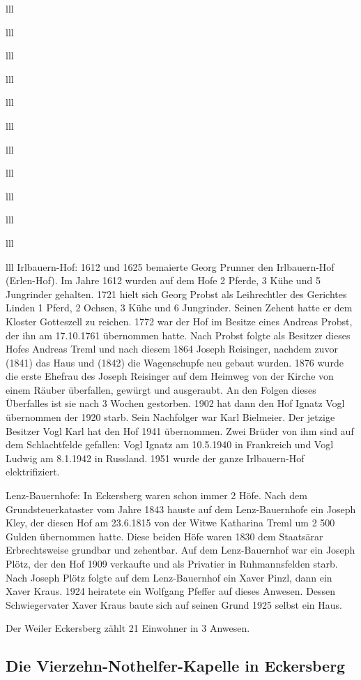 \documentclass[12pt,a4pager]{book}
\begin{document}
\begin{tabuluar}{lll}
\begin{tabuluar}{lll}
\begin{tabuluar}{lll}
\begin{tabuluar}{lll}
\begin{tabuluar}{lll}
\begin{tabuluar}{lll}
\begin{tabuluar}{lll}
\begin{tabuluar}{lll}
\begin{tabuluar}{lll}
\begin{tabuluar}{lll}
\begin{tabuluar}{lll}
\begin{tabuluar}{lll}
Irlbauern-Hof: 1612 und 1625 bemaierte Georg Prunner den Irlbauern-Hof
(Erlen-Hof). Im Jahre 1612 wurden auf dem Hofe 2 Pferde, 3 Kühe und 5 Jungrinder
gehalten. 1721 hielt sich Georg Probst als Leihrechtler des Gerichtes Linden 1
Pferd, 2 Ochsen, 3 Kühe und 6 Jungrinder. Seinen Zehent hatte er dem Kloster
Gotteszell zu reichen. 1772 war der Hof im Besitze eines Andreas Probst, der ihn
am 17.10.1761 übernommen hatte. Nach Probst folgte als Besitzer dieses Hofes
Andreas Treml und nach diesem 1864 Joseph Reisinger, nachdem zuvor (1841) das
Haus und (1842) die Wagenschupfe neu gebaut wurden. 1876 wurde die erste Ehefrau
des Joseph Reisinger auf dem Heimweg von der Kirche von einem Räuber überfallen,
gewürgt und ausgeraubt. An den Folgen dieses Überfalles ist sie nach 3 Wochen
gestorben. 1902 hat dann den Hof Ignatz Vogl übernommen der 1920 starb. Sein
Nachfolger war Karl Bielmeier. Der jetzige Besitzer Vogl Karl hat den Hof 1941
übernommen. Zwei Brüder von ihm sind auf dem Schlachtfelde gefallen: Vogl Ignatz
am 10.5.1940 in Frankreich und Vogl Ludwig am 8.1.1942 in Russland. 1951 wurde
der ganze Irlbauern-Hof elektrifiziert.

Lenz-Bauernhofe: In Eckersberg waren schon immer 2 Höfe. Nach dem
Grundsteuerkataster vom Jahre 1843 hauste auf dem Lenz-Bauernhofe ein Joseph
Kley, der diesen Hof am 23.6.1815 von der Witwe Katharina Treml um 2 500 Gulden
übernommen hatte. Diese beiden Höfe waren 1830 dem Staatsärar Erbrechtsweise
grundbar und zehentbar. Auf dem Lenz-Bauernhof war ein Joseph Plötz, der den Hof
1909 verkaufte und als Privatier in Ruhmannsfelden starb. Nach Joseph Plötz
folgte auf dem Lenz-Bauernhof ein Xaver Pinzl, dann ein Xaver Kraus. 1924
heiratete ein Wolfgang Pfeffer auf dieses Anwesen. Dessen Schwiegervater Xaver
Kraus baute sich auf seinen Grund 1925 selbst ein Haus.

Der Weiler Eckersberg zählt 21 Einwohner in 3 Anwesen.

\subsection{Die Vierzehn-Nothelfer-Kapelle in Eckersberg}


\end{tabuluar}
\end{tabuluar}
\end{tabuluar}
\end{tabuluar}
\end{tabuluar}
\end{tabuluar}
\end{tabuluar}
\end{tabuluar}
\end{tabuluar}
\end{tabuluar}
\end{tabuluar}
\end{tabuluar}
\end{document}
